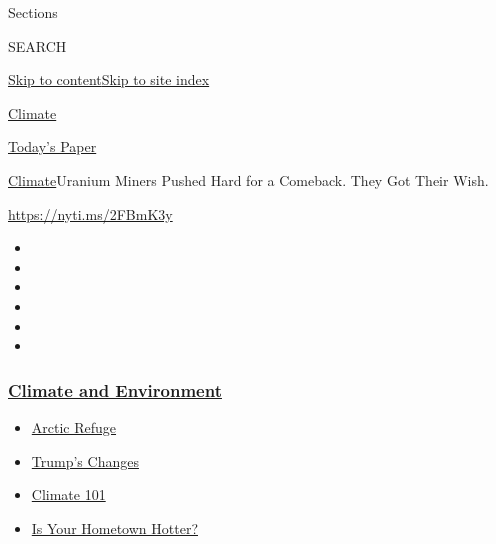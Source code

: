 Sections

SEARCH

\protect\hyperlink{site-content}{Skip to
content}\protect\hyperlink{site-index}{Skip to site index}

\href{https://www.nytimes3xbfgragh.onion/section/climate}{Climate}

\href{https://myaccount.nytimes3xbfgragh.onion/auth/login?response_type=cookie\&client_id=vi}{}

\href{https://www.nytimes3xbfgragh.onion/section/todayspaper}{Today's
Paper}

\href{/section/climate}{Climate}\textbar{}Uranium Miners Pushed Hard for
a Comeback. They Got Their Wish.

\url{https://nyti.ms/2FBmK3y}

\begin{itemize}
\item
\item
\item
\item
\item
\item
\end{itemize}

\hypertarget{climate-and-environment}{%
\subsubsection{\texorpdfstring{\href{https://www.nytimes3xbfgragh.onion/section/climate?name=styln-climate\&region=TOP_BANNER\&variant=undefined\&block=storyline_menu_recirc\&action=click\&pgtype=Article\&impression_id=3d0de680-e388-11ea-b57e-737919ae4111}{Climate
and
Environment}}{Climate and Environment}}\label{climate-and-environment}}

\begin{itemize}
\tightlist
\item
  \href{https://www.nytimes3xbfgragh.onion/2020/08/17/climate/alaska-oil-drilling-anwr.html?name=styln-climate\&region=TOP_BANNER\&variant=undefined\&block=storyline_menu_recirc\&action=click\&pgtype=Article\&impression_id=3d0e0d90-e388-11ea-b57e-737919ae4111}{Arctic
  Refuge}
\item
  \href{https://www.nytimes3xbfgragh.onion/interactive/2020/climate/trump-environment-rollbacks.html?name=styln-climate\&region=TOP_BANNER\&variant=undefined\&block=storyline_menu_recirc\&action=click\&pgtype=Article\&impression_id=3d0e0d91-e388-11ea-b57e-737919ae4111}{Trump's
  Changes}
\item
  \href{https://www.nytimes3xbfgragh.onion/interactive/2020/04/19/climate/climate-crash-course-1.html?name=styln-climate\&region=TOP_BANNER\&variant=undefined\&block=storyline_menu_recirc\&action=click\&pgtype=Article\&impression_id=3d0e0d92-e388-11ea-b57e-737919ae4111}{Climate
  101}
\item
  \href{https://www.nytimes3xbfgragh.onion/interactive/2018/08/30/climate/how-much-hotter-is-your-hometown.html?name=styln-climate\&region=TOP_BANNER\&variant=undefined\&block=storyline_menu_recirc\&action=click\&pgtype=Article\&impression_id=3d0e0d93-e388-11ea-b57e-737919ae4111}{Is
  Your Hometown Hotter?}
\end{itemize}

